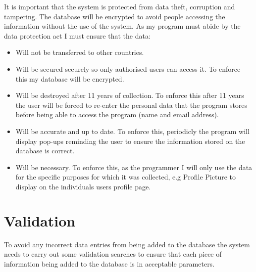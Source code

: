 It is important that the system is protected from data theft, corruption and tampering. The database will be encrypted to avoid people accessing the information without the use of the system. As my program must abide by the data protection act I must ensure that the data:
\begin{itemize}
\item Will not be transferred to other countries.
\item Will be secured securely so only authorised users can access it. To enforce this my database will be encrypted.
\item Will be destroyed after 11 years  of collection. To enforce this after 11 years the user will be forced to re-enter the personal data that the program stores before being able to access the program (name and email address).
\item Will be accurate and up to date. To enforce this, periodicly the program will display pop-ups reminding the user to ensure the information stored on the database is correct.
\item Will be necessary. To enforce this, as the programmer I will only use the data for the specific purposes for which it was collected, e.g Profile Picture to display on the individuals users profile page.
\end{itemize}

\section{Validation}

To avoid any incorrect data entries from being added to the database the system needs to carry out some validation searches to ensure that each piece of information being added to the database is in acceptable parameters. 

